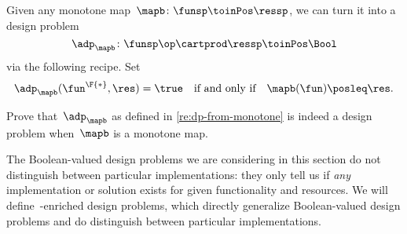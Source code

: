 \begin{remark}
    \label{re:dp-from-monotone}
    Given any monotone map~$\mapb\colon \funsp \toinPos \ressp$, we can turn it into a design problem
    \begin{equation*}
        \adp_\mapb \colon \funsp\op \cartprod \ressp \toinPos \Bool
    \end{equation*}
    via the following recipe.
    Set
    \begin{equation*}
        \adp_\mapb (\fun^\F{*}, \res) = \true \quad \text{if and only if} \quad \mapb(\fun) \posleq \res.
    \end{equation*}
\end{remark}

\begin{exercise}
    \label{ex:adp-monotone}
    Prove that~$\adp_\mapb$ as defined in \cref{re:dp-from-monotone} is indeed a design problem when~$\mapb$ is a monotone map.
\end{exercise}
\begin{solution}
\end{solution}

The Boolean-valued design problems we are considering in this section do not distinguish between particular implementations: they only tell us if \emph{any} implementation or solution exists for given functionality and resources.
We will define~\Set-enriched design problems, which directly generalize Boolean-valued design problems and do distinguish between particular implementations.


